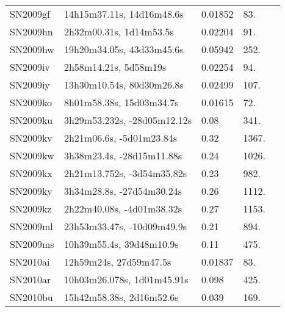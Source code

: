 \begin{longtable}{lllll}
         SN2009gf &      14h15m37.11s, 14d16m48.6s &  0.01852 &            83. &    \citet{1991RC3.9.C...0000d} \\
         SN2009hn &        2h32m00.31s, 1d14m53.5s &  0.02204 &            91. &    \citet{2004ApJ...607..202M} \\
         SN2009hw &      19h20m34.05s, 43d33m45.6s &  0.05942 &           252. &    \citet{1997ApJS..112..245N} \\
         SN2009iv &          2h58m14.21s, 5d58m19s &  0.02254 &            94. &    \citet{1999MNRAS.305..259W} \\
         SN2009iy &      13h30m10.54s, 80d30m26.8s &  0.02499 &           107. &    \citet{1999PASP..111..438F} \\
         SN2009ko &       8h01m58.38s, 15d03m34.7s &  0.01615 &            72. &    \citet{2007SDSS6.C...0000:} \\
         SN2009ku &    3h29m53.232s, -28d05m12.12s &     0.08 &           341. &    \citet{2009CBET.2012A...1R} \\
         SN2009kv &       2h21m06.6s, -5d01m23.84s &     0.32 &          1367. &    \citet{2009CBET.2012A...1R} \\
         SN2009kw &      3h38m23.4s, -28d15m11.88s &     0.24 &          1026. &    \citet{2009CBET.2012A...1R} \\
         SN2009kx &     2h21m13.752s, -3d54m35.82s &     0.23 &           982. &    \citet{2009CBET.2012A...1R} \\
         SN2009ky &      3h34m28.8s, -27d54m30.24s &     0.26 &          1112. &    \citet{2009CBET.2012A...1R} \\
         SN2009kz &      2h22m40.08s, -4d01m38.32s &     0.27 &          1153. &    \citet{2009CBET.2012A...1R} \\
         SN2009ml &     23h53m33.47s, -10d09m49.9s &     0.21 &           894. &    \citet{2009CBET.2089A...1S} \\
         SN2009ms &       10h39m55.4s, 39d48m10.9s &     0.11 &           475. &    \citet{2009CBET.2089A...1S} \\
         SN2010ai &         12h59m24s, 27d59m47.5s &  0.01837 &            83. &    \citet{1996ApJ...458..435C} \\
         SN2010ar &     10h03m26.078s, 1d01m45.91s &    0.098 &           425. &    \citet{2014ApJ...795...44R} \\
         SN2010bu &       15h42m58.38s, 2d16m52.6s &    0.039 &           169. &    \citet{2010CBET.2254A...1D} \\

\end{longtable}
